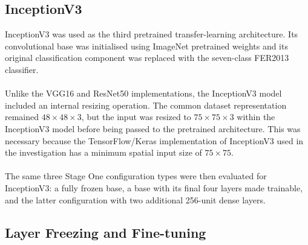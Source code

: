 \documentclass[12pt, a4paper]{report}
\let\oldsubsection\subsection
\renewcommand{\subsection}{%
    \Needspace{6\baselineskip}%
    \oldsubsection
}
\begin{document}
			\subsection{InceptionV3}
				
				InceptionV3 was used as the third pretrained transfer-learning architecture. Its convolutional base was initialised using ImageNet pretrained weights and its original classification component was replaced with the seven-class FER2013 classifier.\\\\
				Unlike the VGG16 and ResNet50 implementations, the InceptionV3 model included an internal resizing operation. The common dataset representation remained $48 \times 48 \times 3$, but the input was resized to $75 \times 75 \times 3$ within the InceptionV3 model before being passed to the pretrained architecture. This was necessary because the TensorFlow/Keras implementation of InceptionV3 used in the investigation has a minimum spatial input size of $75 \times 75$.\\\\
				The same three Stage One configuration types were then evaluated for InceptionV3: a fully frozen base, a base with its final four layers made trainable, and the latter configuration with two additional 256-unit dense layers.

			\subsection{Layer Freezing and Fine-tuning}
				
\end{document}
